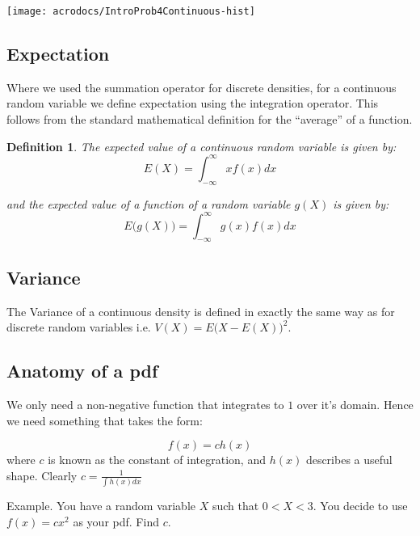 \documentclass[12pt]{extbook}
\newtheorem{df}{Definition}[section]
\begin{document}
\texttt{[image: acrodocs/IntroProb4Continuous-hist]}




\subsection{Expectation}

Where we used the summation operator for discrete densities, for a continuous random variable we define expectation using the integration operator.   This follows from the standard mathematical definition for
the ``average'' of a function.

\begin{df}
The expected value of a continuous random variable is given by:
\begin{displaymath}
E(X) = \int_{-\infty}^{\infty} x f(x) dx
\end{displaymath}

and the expected value of a \emph{function of} a random variable $g(X)$ is given by:
\begin{displaymath}
E \big( g(X) \big) = \int_{-\infty}^{\infty}  g(x) f(x) dx
\end{displaymath}
\end{df}




\subsection{Variance}

The Variance of a continuous density is defined in exactly the same way as for discrete random variables i.e. $V(X) = E \big( X-E(X) \big)^2$.   


\subsection{Anatomy of a pdf}

We only need a non-negative function that integrates to $1$ over it's domain.   Hence we need something that takes the form:

\begin{displaymath}
f(x) = c h(x)
\end{displaymath}
where $c$ is known as the constant of integration, and $h(x)$ describes a useful shape.   Clearly $c=\frac{1}{\int h(x) dx}$

Example.   You have a random variable $X$ such that $0 < X < 3$.   You decide to use $f(x) = c x^2$ as your pdf.   Find $c$.
\end{document}
